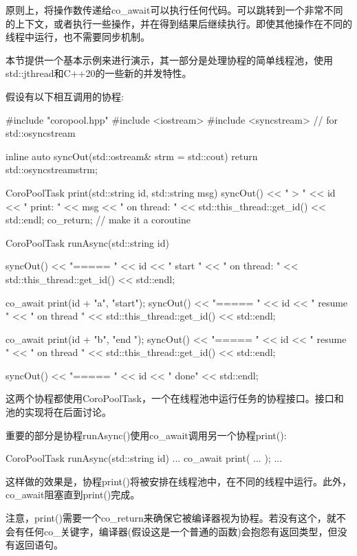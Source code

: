 

原则上，将操作数传递给co\_await可以执行任何代码。可以跳转到一个非常不同的上下文，或者执行一些操作，并在得到结果后继续执行。即使其他操作在不同的线程中运行，也不需要同步机制。

本节提供一个基本示例来进行演示，其一部分是处理协程的简单线程池，使用std::jthread和C++20的一些新的并发特性。


假设有以下相互调用的协程:


\begin{cpp}
#include "coropool.hpp"
#include <iostream>
#include <syncstream> // for std::osyncstream

inline auto syncOut(std::ostream& strm = std::cout) {
	return std::osyncstream{strm};
}

CoroPoolTask print(std::string id, std::string msg)
{
	syncOut() << "       > " << id << " print: " << msg
			  << "       on thread: " << std::this_thread::get_id() << std::endl;
	co_return; // make it a coroutine
}

CoroPoolTask runAsync(std::string id)
{
	syncOut() << "===== " << id << " start "
			  << "   on thread: " << std::this_thread::get_id() << std::endl;

	co_await print(id + "a", "start");
	syncOut() << "===== " << id << " resume "
			  << "   on thread " << std::this_thread::get_id() << std::endl;

	co_await print(id + "b", "end ");
	syncOut() << "===== " << id << " resume "
			  << "   on thread " << std::this_thread::get_id() << std::endl;
	
	syncOut() << "===== " << id << " done" << std::endl;
}
\end{cpp}

这两个协程都使用CoroPoolTask，一个在线程池中运行任务的协程接口。接口和池的实现将在后面讨论。

重要的部分是协程runAsync()使用co\_await调用另一个协程print():

\begin{cpp}
CoroPoolTask runAsync(std::string id)
{
	...
	co_await print( ... );
	...
}
\end{cpp}

这样做的效果是，协程print()将被安排在线程池中，在不同的线程中运行。此外，co\_await阻塞直到print()完成。

注意，print()需要一个co\_return来确保它被编译器视为协程。若没有这个，就不会有任何co\_关键字，编译器(假设这是一个普通的函数)会抱怨有返回类型，但没有返回语句。


